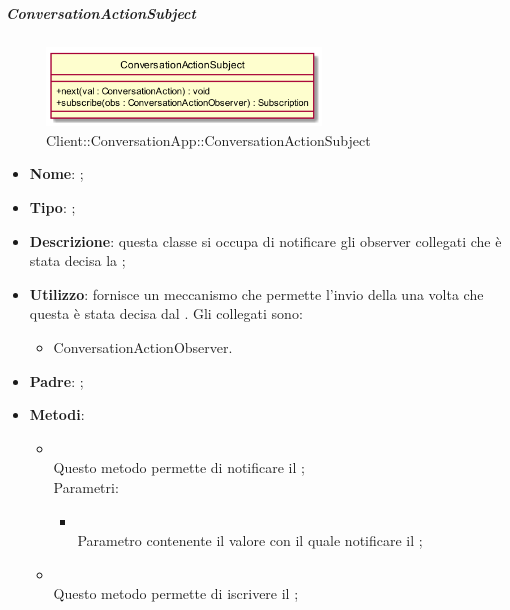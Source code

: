 \hypertarget{ConversationActionSubject_label}{\subparagraph{ConversationActionSubject}}
\begin{figure}[h]
	\centering
	\includegraphics[width=0.65\textwidth,height=\textheight,keepaspectratio]{images/ClassConversationActionSubject.png}
	\caption{Client::ConversationApp::ConversationActionSubject}
\end{figure}
\begin{itemize}
	\item \textbf{Nome}: ;
	\item \textbf{Tipo}: ;
	\item \textbf{Descrizione}: questa classe si occupa di notificare gli observer collegati che è stata decisa la ;
	\item \textbf{Utilizzo}: fornisce un meccanismo che permette l'invio della  una volta che questa è stata decisa dal .
Gli  collegati sono:
\begin{itemize}
\item ConversationActionObserver.
\end{itemize}
	\item \textbf{Padre}: ;
	\item \textbf{Metodi}:
	\begin{itemize}
		\item[]  \\		Questo metodo permette di notificare il ;\\
		Parametri:
		\begin{itemize}
			\item {} \\
			Parametro contenente il valore con il quale notificare il ;
		\end{itemize}
		\item[]  \\		Questo metodo permette di iscrivere il ;\\

\end{itemize}
\end{itemize}
